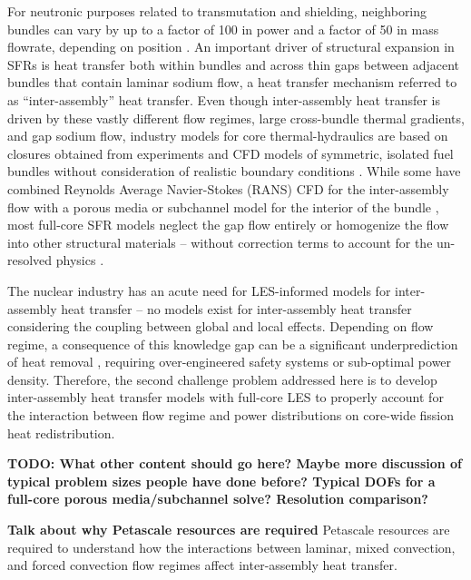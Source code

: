\documentclass[11pt,letterpaper,english]{article}
\begin{document}
For neutronic purposes related to transmutation and shielding, neighboring bundles can vary by up to a factor of 100 in power and a factor of 50 in mass flowrate, depending on position \cite{abr}. An important driver of structural expansion in SFRs is heat transfer both within bundles and across thin gaps between adjacent bundles that contain laminar sodium flow, a heat transfer mechanism referred to as ``inter-assembly'' heat transfer. Even though inter-assembly heat transfer is driven by these vastly different flow regimes, large cross-bundle thermal gradients, and gap sodium flow, industry models for core thermal-hydraulics are based on closures obtained from experiments and CFD models of symmetric, isolated fuel bundles without consideration of realistic boundary conditions \cite{touran}. While some have combined Reynolds Average Navier-Stokes (RANS) CFD for the inter-assembly flow with a porous media or subchannel model for the interior of the bundle \cite{wang2020,gerschenfeld}, most full-core SFR models neglect the gap flow entirely \cite{touran} or homogenize the flow into other structural materials \cite{fiorina_of} -- without correction terms to account for the un-resolved physics \cite{touran,fiorina_of}. 

The nuclear industry has an acute need for LES-informed models for inter-assembly heat transfer -- no models exist for inter-assembly heat transfer considering the coupling between global and local effects. Depending on flow regime, a consequence of this knowledge gap can be a significant underprediction of heat removal \cite{gerschenfeld}, requiring over-engineered safety systems or sub-optimal power density. Therefore, the second challenge problem addressed here is to develop inter-assembly heat transfer models with full-core LES to properly account for the interaction between flow regime and power distributions on core-wide fission heat redistribution. 


{\bf TODO: What other content should go here? Maybe more discussion of typical problem sizes people have done before? Typical DOFs for a full-core porous media/subchannel solve? Resolution comparison?}

{\bf Talk about why Petascale resources are required}
Petascale resources are required to understand how the interactions between laminar, mixed convection, and forced convection flow regimes affect inter-assembly heat transfer.

\end{document}
